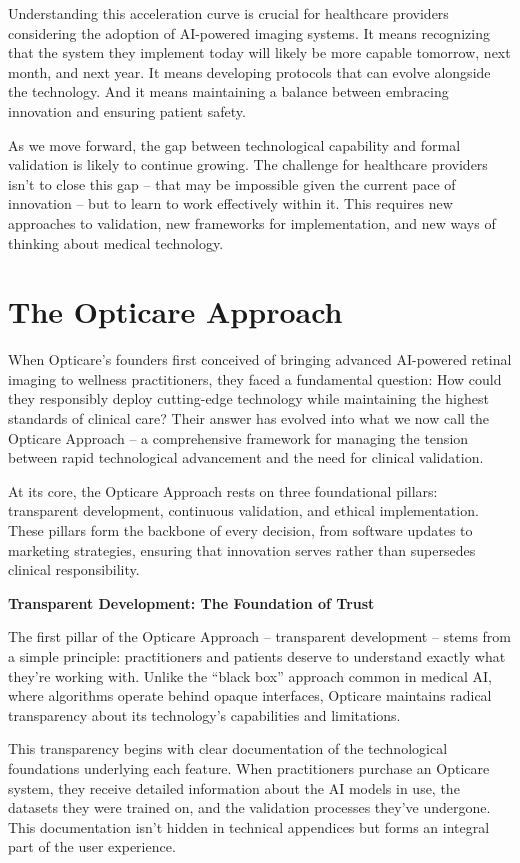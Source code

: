 \documentclass[
  Letterpaper,
]{scrbook}
\begin{document}
Understanding this acceleration curve is crucial for healthcare
providers considering the adoption of AI-powered imaging systems. It
means recognizing that the system they implement today will likely be
more capable tomorrow, next month, and next year. It means developing
protocols that can evolve alongside the technology. And it means
maintaining a balance between embracing innovation and ensuring patient
safety.

As we move forward, the gap between technological capability and formal
validation is likely to continue growing. The challenge for healthcare
providers isn't to close this gap -- that may be impossible given the
current pace of innovation -- but to learn to work effectively within
it. This requires new approaches to validation, new frameworks for
implementation, and new ways of thinking about medical technology.

\section{The Opticare Approach}\label{the-opticare-approach}

When Opticare's founders first conceived of bringing advanced AI-powered
retinal imaging to wellness practitioners, they faced a fundamental
question: How could they responsibly deploy cutting-edge technology
while maintaining the highest standards of clinical care? Their answer
has evolved into what we now call the Opticare Approach -- a
comprehensive framework for managing the tension between rapid
technological advancement and the need for clinical validation.

At its core, the Opticare Approach rests on three foundational pillars:
transparent development, continuous validation, and ethical
implementation. These pillars form the backbone of every decision, from
software updates to marketing strategies, ensuring that innovation
serves rather than supersedes clinical responsibility.

\textbf{Transparent Development: The Foundation of Trust}

The first pillar of the Opticare Approach -- transparent development --
stems from a simple principle: practitioners and patients deserve to
understand exactly what they're working with. Unlike the ``black box''
approach common in medical AI, where algorithms operate behind opaque
interfaces, Opticare maintains radical transparency about its
technology's capabilities and limitations.

This transparency begins with clear documentation of the technological
foundations underlying each feature. When practitioners purchase an
Opticare system, they receive detailed information about the AI models
in use, the datasets they were trained on, and the validation processes
they've undergone. This documentation isn't hidden in technical
appendices but forms an integral part of the user experience.
\end{document}

